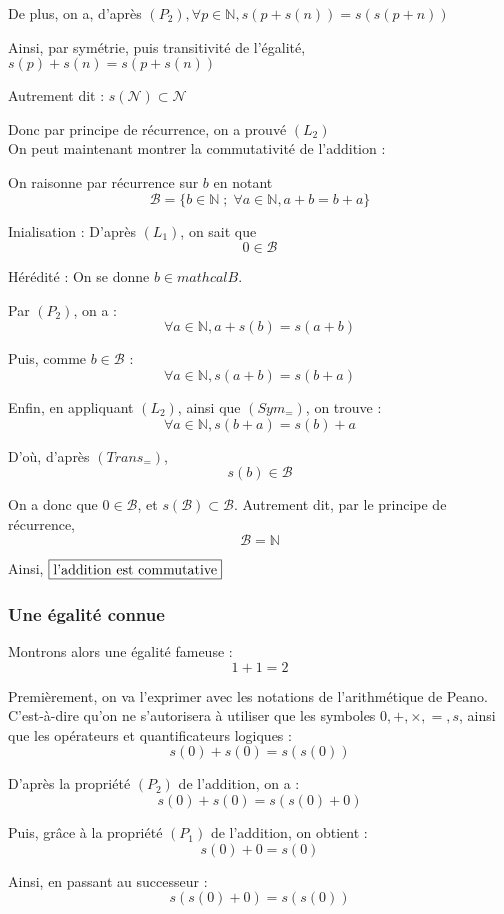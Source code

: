 \documentclass{article}
\begin{document}
De plus, on a, d'après $(P_2), \forall p \in \mathbb{N}, s(p+s(n)) = s(s(p+n)) $

Ainsi, par symétrie, puis transitivité de l'égalité, $s(p) + s(n) = s(p+s(n))$

Autrement dit : $s(\mathcal{N}) \subset \mathcal{N}$

Donc par principe de récurrence, on a prouvé $(L_2)$
\\

On peut maintenant montrer la commutativité de l'addition :

On raisonne par récurrence sur $b$ en notant $$\mathcal{B} = \{ b \in \mathbb{N} \; ; \; \forall a \in \mathbb{N}, a + b = b + a \}$$ 

Inialisation : D'après $(L_1)$, on sait que 
$$0 \in \mathcal{B}$$

Hérédité : On se donne $b \in mathcal{B}$.

Par $(P_2)$, on a :
$$\forall a \in \mathbb{N}, a + s(b) = s(a+b)$$

Puis, comme $b \in \mathcal{B}$ :
$$\forall a \in \mathbb{N}, s(a+b) = s(b+a)$$

Enfin, en appliquant $(L_2)$, ainsi que $(Sym_=)$, on trouve :
$$\forall a \in \mathbb{N}, s(b+a) = s(b) + a$$

D'où, d'après $(Trans_=)$,
$$s(b) \in \mathcal{B}$$

On a donc que $0 \in \mathcal{B}$, et $s(\mathcal{B}) \subset \mathcal{B}$. Autrement dit, par le principe de récurrence, $$\mathcal{B} = \mathbb{N}$$

Ainsi, $\boxed{\textup{l'addition est commutative}}$

\subsubsection{Une égalité connue}
Montrons alors une égalité fameuse : 
$$1+1 = 2$$

Premièrement, on va l'exprimer avec les notations de l'arithmétique de Peano. C'est-à-dire qu'on ne s'autorisera à utiliser que les symboles $0,+,\times,=,s$, ainsi que les opérateurs et quantificateurs logiques :
$$s(0) + s(0) = s(s(0))$$

D'après la propriété $(P_2)$ de l'addition, on a :
$$s(0) + s(0) = s(s(0) + 0)$$

Puis, grâce à la propriété $(P_1)$ de l'addition, on obtient :
$$s(0) + 0 = s(0)$$

Ainsi, en passant au successeur :
$$s(s(0)+0) = s(s(0))$$
\end{document}
